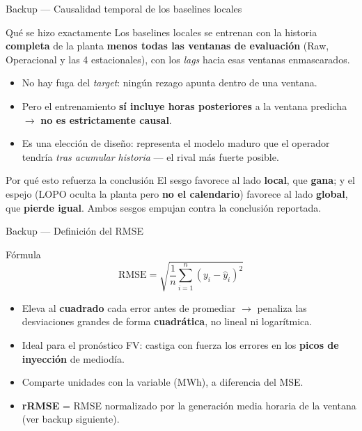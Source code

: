 \documentclass[10pt,aspectratio=169]{beamer}
\newcommand{\gl}[1]{\textcolor{glob}{\textbf{#1}}}
\newcommand{\lo}[1]{\textcolor{loc}{\textbf{#1}}}
\newcommand{\rj}[1]{\textcolor{alertred}{\textbf{#1}}}
\begin{document}
\begin{frame}{Backup --- Causalidad temporal de los baselines locales}
  \begin{block}{Qué se hizo exactamente}
    Los baselines locales se entrenan con la historia \textbf{completa} de la planta
    \textbf{menos todas las ventanas de evaluación} (Raw, Operacional y las 4
    estacionales), con los \emph{lags} hacia esas ventanas enmascarados.
  \end{block}
  \begin{itemize}
    \item No hay fuga del \emph{target}: ningún rezago apunta dentro de una ventana.
    \item Pero el entrenamiento \textbf{sí incluye horas posteriores} a la ventana
          predicha $\rightarrow$ \rj{no es estrictamente causal}.
    \item Es una elección de diseño: representa el modelo maduro que el operador
          tendría \emph{tras acumular historia} — el rival más fuerte posible.
  \end{itemize}
  \begin{exampleblock}{Por qué esto refuerza la conclusión}
    El sesgo favorece al lado \lo{local}, que \textbf{gana}; y el espejo (LOPO oculta
    la planta pero \textbf{no el calendario}) favorece al lado \gl{global}, que
    \textbf{pierde igual}. Ambos sesgos empujan contra la conclusión reportada.
  \end{exampleblock}
\end{frame}

\fi%

\begin{frame}{Backup --- Definición del RMSE}
  \begin{block}{Fórmula}
    \[
      \mathrm{RMSE} = \sqrt{\frac{1}{n}\sum_{i=1}^{n}\left(y_i - \hat{y}_i\right)^2}
    \]
  \end{block}
  \begin{itemize}
    \item Eleva al \textbf{cuadrado} cada error antes de promediar $\rightarrow$ penaliza las desviaciones grandes de forma \rj{cuadrática}, no lineal ni logarítmica.
    \item Ideal para el pronóstico FV: castiga con fuerza los errores en los \textbf{picos de inyección} de mediodía.
    \item Comparte unidades con la variable (MWh), a diferencia del MSE.
    \item \textbf{rRMSE} = RMSE normalizado por la generación media horaria de la ventana (ver backup siguiente).
  \end{itemize}
\end{frame}
\end{document}
